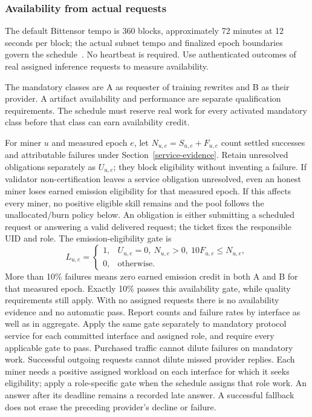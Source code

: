 \subsubsection{Availability from actual requests}

The default Bittensor tempo is 360 blocks, approximately 72 minutes at
12 seconds per block; the actual subnet tempo and finalized epoch
boundaries govern the schedule~\cite{tempo}. No heartbeat is required.
Use authenticated outcomes of real assigned inference requests to
measure availability.

The mandatory classes are A as requester of training rewrites and B as
their provider.
A artifact availability and performance are separate qualification
requirements. The schedule must reserve real work for every activated
mandatory class before that class can earn availability credit.

For miner \(u\) and measured epoch \(e\), let \(N_{u,e}=S_{u,e}+F_{u,e}\)
count settled successes and attributable failures under
Section~\ref{service-evidence}. Retain unresolved obligations separately
as \(U_{u,e}\); they block eligibility without inventing a failure.
If validator non-certification leaves a service obligation unresolved,
even an honest miner loses earned emission eligibility for that measured
epoch. If this affects every miner, no positive eligible skill remains
and the pool follows the unallocated/burn policy below.
An obligation is either submitting a scheduled request or answering a
valid delivered request; the ticket fixes the responsible UID and role.
The emission-eligibility
gate is
\begin{equation}\label{eq:availability-gate}
 L_{u,e}=\begin{cases}
 1,&U_{u,e}=0,\ N_{u,e}>0,\ 10F_{u,e}\leq N_{u,e},\\
 0,&\text{otherwise}.
 \end{cases}
\end{equation}
More than 10\% failures means zero earned emission credit in both A and
B for that measured epoch. Exactly 10\% passes this availability gate,
while quality requirements still apply. With no assigned requests there
is no availability evidence and no automatic pass. Report counts and
failure rates by interface as well as in aggregate. Apply the same gate
separately to mandatory protocol service for each committed interface
and assigned role,
and require every applicable gate to pass. Purchased traffic cannot
dilute failures on mandatory work. Successful outgoing requests cannot
dilute missed provider replies. Each miner needs a positive assigned
workload on each interface for which it seeks eligibility; apply a
role-specific gate when the schedule assigns that role work.
An answer after its deadline remains a recorded late answer. A successful
fallback does not erase the preceding provider's decline or failure.

